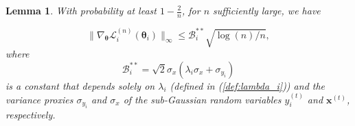 \documentclass{article} %
\def\eqref#1{equation~\ref{#1}}
\renewcommand{\eqref}[1]{(\ref{#1})}
\newtheorem{lemma}[theorem]{Lemma}
\begin{document}
\begin{lemma}\label{lemma:STEP III} With probability at least $1-\tfrac{2}{n}$, for $n$ sufficiently large, we have 

$$
\|\nabla_{\boldsymbol{\theta}} \mathscr{L}_i^{(n)}\left(\boldsymbol{\theta}_i\right)\|_{\infty} \leq \mathscr{B}_i^{**} \sqrt{\log(n)/n},
$$
where 
\begin{equation}\label{B**}
\mathscr{B}_i^{**} = \sqrt{2} \sigma_x \left( \lambda_i\sigma_x+\sigma_{y_i} \right)
\end{equation}
is a constant that depends solely on $\lambda_i$ (defined in \eqref{def:lambda_i}) and the variance proxies $\sigma_{y_i}$ and $\sigma_x$ of the sub-Gaussian random variables $y_i^{(t)}$ and $\mathbf{x}^{(t)}$, respectively.
\end{lemma}
\end{document}
